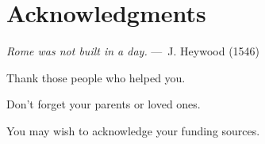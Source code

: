 
\chapter{Acknowledgments}

\begin{epigraph}
    \emph{Rome was not built in a day.} ---~J. Heywood  (1546)
\end{epigraph}

Thank those people who helped you. 

Don't forget your parents or loved ones.

You may wish to acknowledge your funding sources.
